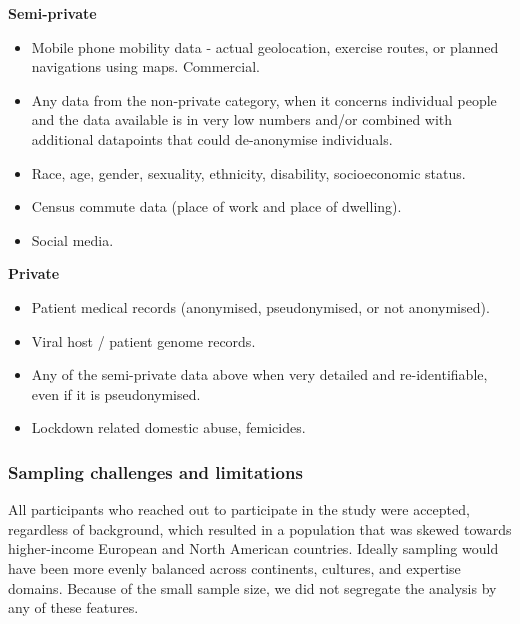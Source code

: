 \documentclass{CUP-JNL-DAP}%
\begin{document}
\textbf{Semi-private}
\begin{itemize}
\item Mobile phone mobility data - actual geolocation, exercise routes, or planned navigations using maps. Commercial. 
\item Any data from the non-private category, when it concerns individual people and the data available is in very low numbers and/or combined with additional datapoints that could de-anonymise individuals. 
\item Race, age, gender, sexuality, ethnicity, disability, socioeconomic status.
\item Census commute data (place of work and place of dwelling). 
\item Social media.
\end{itemize}

\textbf{Private}
\begin{itemize}
\item Patient medical records (anonymised, pseudonymised, or not anonymised).
\item Viral host / patient genome records.
\item Any of the semi-private data above when very detailed and re-identifiable, even if it is pseudonymised.
\item Lockdown related domestic abuse, femicides. 
\end{itemize}

\subsubsection{Sampling challenges and limitations}

All participants who reached out to participate in the study were accepted, regardless of background, which resulted in a population that was skewed towards higher-income European and North American countries. Ideally sampling would have been more evenly balanced across continents, cultures, and expertise domains. Because of the small sample size, we did not segregate the analysis by any of these features.
\end{document}
